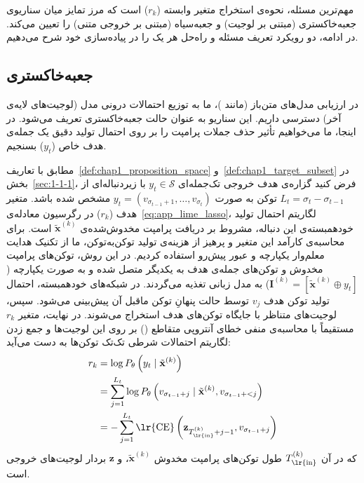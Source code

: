 مهم‌ترین مسئله، نحوه‌ی استخراج متغیر وابسته ($r_k$) است که مرز تمایز میان سناریوی جعبه‌خاکستری (مبتنی بر لوجیت) و جعبه‌سیاه (مبتنی بر خروجی متنی) را تعیین می‌کند. در ادامه، دو رویکرد تعریف مسئله و راه‌حل هر یک را در پیاده‌سازی خود شرح می‌دهیم.


\subsection{ جعبه‌خاکستری}\label{app:lime_graybox}

در ارزیابی مدل‌های متن‌باز (مانند )، ما به توزیع احتمالات درونی مدل (لوجیت‌های لایه‌ی آخر) دسترسی داریم. این سناریو به عنوان حالت جعبه‌خاکستری تعریف می‌شود. در اینجا، ما می‌خواهیم تأثیر حذف جملات پرامپت را بر روی احتمال تولید دقیق یک جمله‌ی هدف خاص ($y_t$) بسنجیم.

مطابق با تعاریف~\ref{def:chap1_proposition_space} و~\ref{def:chap1_target_subset} در بخش~\ref{sec:1-1-1}، فرض کنید گزاره‌ی هدف خروجی تک‌جمله‌ای $y_t \in \mathcal{S}$ با زیردنباله‌ای از $L_t = \sigma_t - \sigma_{t-1}$ توکن به صورت $y_t = (v_{\sigma_{t-1}+1}, \dots, v_{\sigma_t})$ مشخص شده باشد. متغیر هدف ($r_k$) در رگرسیون معادله‌ی~\ref{eq:app_lime_lasso}، لگاریتم احتمال تولید خودهمبسته‌ی این دنباله، مشروط بر دریافت پرامپت مخدوش‌شده‌ی $\tilde{\mathbf{x}}^{(k)}$ است. برای محاسبه‌ی کارآمد این متغیر و پرهیز از هزینه‌ی تولید توکن‌به‌توکن، ما از تکنیک هدایت معلم‌وار یکپارچه و عبور پیش‌رو استفاده کردیم. در این روش، توکن‌های پرامپت مخدوش و توکن‌های جمله‌ی هدف به یکدیگر متصل شده و به صورت یکپارچه ($\mathbf{I}^{(k)} = [\tilde{\mathbf{x}}^{(k)} \oplus y_t]$) به مدل زبانی تغذیه می‌گردند. در شبکه‌های خودهمبسته، احتمال تولید توکن هدف $v_j$ توسط حالت پنهانِ توکن ماقبل آن پیش‌بینی می‌شود. سپس، لوجیت‌های متناظر با جایگاه توکن‌های هدف استخراج می‌شوند. در نهایت، متغیر $r_k$ مستقیماً با محاسبه‌ی منفی خطای آنتروپی متقاطع () بر روی این لوجیت‌ها و جمع زدن لگاریتم احتمالات شرطی تک‌تک توکن‌ها به دست می‌آید:
\begin{equation}\label{eq:app_lime_graybox_target}
\begin{split}
    r_k &= \log P_\theta\left(y_t \mid \tilde{\mathbf{x}}^{(k)}\right) \\
    &= \sum_{j=1}^{L_t} \log P_\theta\left(v_{\sigma_{t-1}+j} \mid \tilde{\mathbf{x}}^{(k)}, v_{\sigma_{t-1}+<j}\right) \\
    &= -\sum_{j=1}^{L_t} \text{\lr{CE}}\left(\mathbf{z}_{T_{\text{\lr{in}}}^{(k)}+j-1}, v_{\sigma_{t-1}+j}\right)
\end{split}
\end{equation}
که در آن $T_{\text{\lr{in}}}^{(k)}$ طول توکن‌های پرامپت مخدوش $\tilde{\mathbf{x}}^{(k)}$، و $\mathbf{z}$ بردار لوجیت‌های خروجی است.

